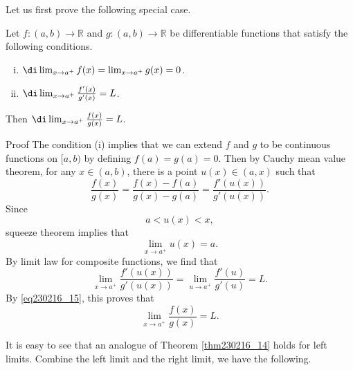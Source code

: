 Let us first prove the following special case.
\begin{theorem}[label=thm230216_14]{}
Let $f:(a,b)\to\mathbb{R}$ and $g:(a,b)\to\mathbb{R}$ be differentiable functions that satisfy the following conditions.
\begin{enumerate}[(i)]
\item $\di\lim_{x\rightarrow a^+}f(x)=\lim_{x\rightarrow a^+}g(x)=0$.
\item $\di\lim_{x\rightarrow a^+}\frac{f'(x)}{g'(x)}=L$.

\end{enumerate}
Then $\di \lim_{x\rightarrow a^+}\frac{f(x)}{g(x)}=L$.
\end{theorem}
\begin{myproof}{Proof}
The condition (i) implies that we can extend $f$ and $g$ to be continuous functions on $[a, b)$ by defining $f(a)=g(a)=0$. Then by Cauchy mean value theorem, for any $x\in (a, b)$, there is a point $u(x)\in (a, x)$ such that
\begin{equation}\label{eq230216_15}\frac{f(x)}{g(x)}=\frac{f(x)-f(a)}{g(x)-g(a)}=\frac{f'(u(x))}{g'(u(x))}.\end{equation}\bp
 Since 
\[a<u(x)<x,\]
squeeze theorem implies that
\[\lim_{x\to a^+}u(x)=a.\] 
By limit law for composite functions, we find that
\[\lim_{x\to a^+}\frac{f'(u(x))}{g'(u(x))}=\lim_{u\to a^+}\frac{f'(u)}{g'(u)}=L.\]
By \eqref{eq230216_15}, this proves that
\[\lim_{x\rightarrow a^+}\frac{f(x)}{g(x)}=L.\]
\end{myproof}

It is easy to see that an analogue of Theorem \ref{thm230216_14} holds for left limits.  Combine the left limit and the right limit, we have the following.

